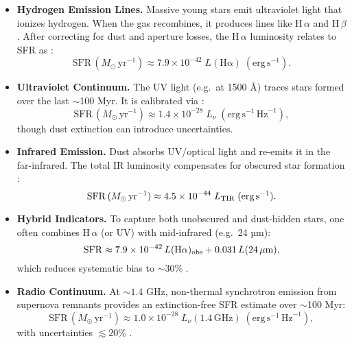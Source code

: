 \documentclass[english,bachelor,oneside]{ctufit-thesis}
\begin{document}
\begin{itemize}
  \item \textbf{Hydrogen Emission Lines.} Massive young stars emit ultraviolet light that ionizes hydrogen. When the gas recombines, it produces lines like H\,$\alpha$ and H\,$\beta$. After correcting for dust and aperture losses, the H\,$\alpha$ luminosity relates to SFR as \cite{kennicutt1998star}:
  \[
    \mathrm{SFR}\,(M_{\odot}\,\mathrm{yr}^{-1})
    \approx 7.9 \times 10^{-42}\;L(\mathrm{H\alpha})\;(\mathrm{erg\,s}^{-1}).
  \]

  \item \textbf{Ultraviolet Continuum.} The UV light (e.g.\ at 1500 Å) traces stars formed over the last $\sim$100 Myr. It is calibrated via \cite{KennicuttEvans2012}:
  \[
    \mathrm{SFR}\,(M_{\odot}\,\mathrm{yr}^{-1})
    \approx 1.4 \times 10^{-28}\;L_\nu\;(\mathrm{erg\,s}^{-1}\,\mathrm{Hz}^{-1}),
  \]
  though dust extinction can introduce uncertainties.

  \item \textbf{Infrared Emission.} Dust absorbs UV/optical light and re-emits it in the far-infrared. The total IR luminosity compensates for obscured star formation \cite{KennicuttEvans2012}:
  \[
    \mathrm{SFR}\,(M_{\odot}\,\mathrm{yr}^{-1})
    \approx 4.5 \times 10^{-44}\;L_{\rm TIR}\;(\mathrm{erg\,s}^{-1}).
  \]

  \item \textbf{Hybrid Indicators.} To capture both unobscured and dust-hidden stars, one often combines H\,$\alpha$ (or UV) with mid-infrared (e.g.\ 24 µm):  
  \[
    \mathrm{SFR}
    \approx 7.9\times10^{-42}\,L(\mathrm{H\alpha})_{\rm obs}
    + 0.031\,L(24\,\mu\mathrm{m}),
  \]
  which reduces systematic bias to $\sim30\%$ \cite{calzetti2010calibration}.

  \item \textbf{Radio Continuum.} At $\sim1.4$ GHz, non-thermal synchrotron emission from supernova remnants provides an extinction-free SFR estimate over $\sim$100 Myr:
  \[
    \mathrm{SFR}\,(M_{\odot}\,\mathrm{yr}^{-1})
    \approx 1.0 \times 10^{-28}\;L_\nu(1.4\,\mathrm{GHz})\;(\mathrm{erg\,s}^{-1}\,\mathrm{Hz}^{-1}),
  \]
  with uncertainties $\lesssim20\%$ \cite{murphy2011calibrating}.
\end{itemize}
\end{document}
